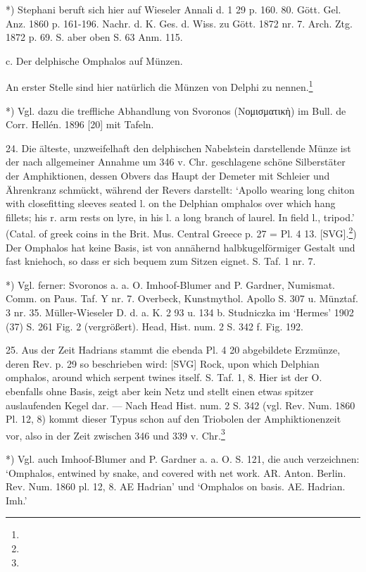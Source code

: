 \documentclass[a4paper, 11pt, oneside]{article}
\begin{document}
*) Stephani beruft sich hier auf Wieseler Annali d. 1 29 p. 160. 80. Gött. Gel. Anz. 1860 p. 161-196. Nachr. d. K. Ges. d. Wiss. zu Gött. 1872 nr. 7. Arch. Ztg. 1872 p. 69. S. aber oben S. 63 Anm. 115.

c. Der delphische Omphalos auf Münzen.

An erster Stelle sind hier natürlich die Münzen von Delphi zu nennen.\footnote{}

*) Vgl. dazu die treffliche Abhandlung von Svoronos (Νομισματικὴ) im Bull. de Corr. Hellén. 1896 [20] mit Tafeln.

24. Die älteste, unzweifelhaft den delphischen Nabelstein darstellende Münze ist der nach allgemeiner Annahme um 346 v. Chr. geschlagene schöne Silberstäter der Amphiktionen, dessen Obvers das Haupt der Demeter mit Schleier und Ährenkranz schmückt, während der Revers darstellt: `Apollo wearing long chiton with closefitting sleeves seated l. on the Delphian omphalos over which hang fillets; his r. arm rests on lyre, in his l. a long branch of laurel. In field l., tripod.' (Catal. of greek coins in the Brit. Mus. Central Greece p. 27 = Pl. 4 13. [SVG].\footnote{}) Der Omphalos hat keine Basis, ist von annähernd halbkugelförmiger Gestalt und fast kniehoch, so dass er sich bequem zum Sitzen eignet. S. Taf. 1 nr. 7.

*) Vgl. ferner: Svoronos a. a. O. Imhoof-Blumer and P. Gardner, Numismat. Comm. on Paus. Taf. Y nr. 7. Overbeck, Kunstmythol. Apollo S. 307 u. Münztaf. 3 nr. 35. Müller-Wieseler D. d. a. K. 2 93 u. 134 b. Studniczka im `Hermes' 1902 (37) S. 261 Fig. 2 (vergrößert). Head, Hist. num. 2 S. 342 f. Fig. 192.

25. Aus der Zeit Hadrians stammt die ebenda Pl. 4 20 abgebildete Erzmünze, deren Rev. p. 29 so beschrieben wird: [SVG] Rock, upon which Delphian omphalos, around which serpent twines itself. S. Taf. 1, 8. Hier ist der O. ebenfalls ohne Basis, zeigt aber kein Netz und stellt einen etwas spitzer auslaufenden Kegel dar. --- Nach Head Hist. num. 2 S. 342 (vgl. Rev. Num. 1860 Pl. 12, 8) kommt dieser Typus schon auf den Triobolen der Amphiktionenzeit vor, also in der Zeit zwischen 346 und 339 v. Chr.\footnote{}

*) Vgl. auch Imhoof-Blumer and P. Gardner a. a. O. S. 121, die auch verzeichnen: `Omphalos, entwined by snake, and covered with net work. AR. Anton. Berlin. Rev. Num. 1860 pl. 12, 8. AE Hadrian' und `Omphalos on basis. AE. Hadrian. Imh.'
\end{document}
